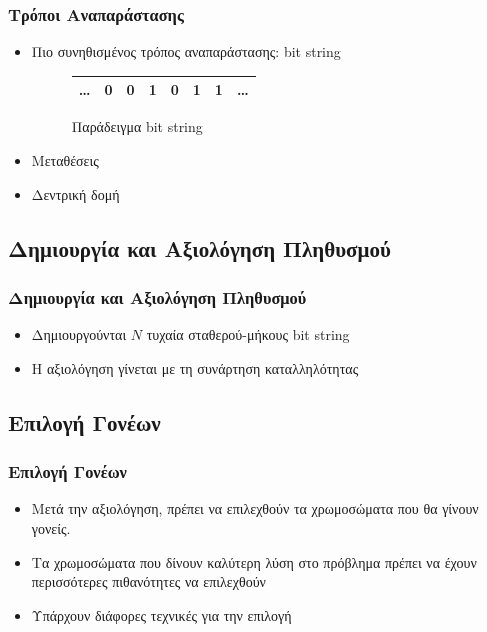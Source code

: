 \documentclass[xetex,mathserif,serif,14pt]{beamer}
\begin{document}
\begin{frame}
\frametitle{Τρόποι Αναπαράστασης}
\begin{itemize}
  \item Πιο συνηθισμένος τρόπος αναπαράστασης: bit string
  \begin{figure}
    \renewcommand{\arraystretch}{1.3}
    \label{fig_bit_string}
    \centering
    \begin{tabular}{c|c|c|c|c|c|c|c}
        \hline
        \ldots & 0 & 0 & 1 & 0 & 1 & 1 & \ldots\\
        \hline
    \end{tabular}
    \caption{Παράδειγμα bit string}
  \end{figure}
  \item Μεταθέσεις
  \item Δεντρική δομή
\end{itemize}
\end{frame}

\subsection{Δημιουργία και Αξιολόγηση Πληθυσμού}

\begin{frame}
\frametitle{Δημιουργία και Αξιολόγηση Πληθυσμού}
\begin{itemize}
  \item Δημιουργούνται $N$ τυχαία σταθερού-μήκους bit string
  \item Η αξιολόγηση γίνεται με τη συνάρτηση καταλληλότητας
\end{itemize}
\end{frame}

\subsection{Επιλογή Γονέων}

\begin{frame}
\frametitle{Επιλογή Γονέων}
\begin{itemize}
  \item Μετά την αξιολόγηση, πρέπει να επιλεχθούν τα χρωμοσώματα που θα γίνουν γονείς.
  \item Τα χρωμοσώματα που δίνουν καλύτερη λύση στο πρόβλημα πρέπει να έχουν περισσότερες πιθανότητες να επιλεχθούν
  \item Υπάρχουν διάφορες τεχνικές για την επιλογή
\end{itemize}
\end{frame}
\end{document}
